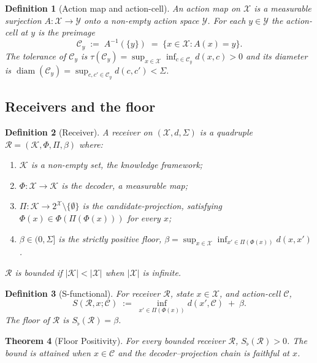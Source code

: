 \documentclass[11pt,a4paper]{article}
\newtheorem{theorem}{Theorem}[section]
\newtheorem{definition}[theorem]{Definition}
\DeclareMathOperator{\diam}{diam}
\newcommand{\Cands}{\mathcal{X}}
\newcommand{\Action}{\mathcal{Y}}
\newcommand{\Knowl}{\mathcal{K}}
\newcommand{\Cell}{\mathcal{C}}
\newcommand{\receiver}{\mathcal{R}}
\newcommand{\Sigmax}{\Sigma}
\newcommand{\Sscalar}{S}
\newcommand{\Sfloor}{S_{\flat}}
\begin{document}
\begin{definition}[Action map and action-cell]
\label{def:action}
An \emph{action map} on $\Cands$ is a measurable surjection $A : \Cands \to \Action$ onto a non-empty action space $\Action$. For each $y \in \Action$ the \emph{action-cell at $y$} is the preimage
\[
\Cell_y \;:=\; A^{-1}(\{y\}) \;=\; \{x \in \Cands : A(x) = y\}.
\]
The \emph{tolerance} of $\Cell_y$ is $\tau(\Cell_y) = \sup_{x \in \Cands} \inf_{c \in \Cell_y} d(x, c) > 0$ and its \emph{diameter} is $\diam(\Cell_y) = \sup_{c, c' \in \Cell_y} d(c, c') < \Sigmax$.
\end{definition}

\subsection{Receivers and the floor}

\begin{definition}[Receiver]
\label{def:receiver}
A \emph{receiver} on $(\Cands, d, \Sigmax)$ is a quadruple $\receiver = (\Knowl, \Phi, \Pi, \beta)$ where:
\begin{enumerate}[nosep, label=(\roman*)]
\item $\Knowl$ is a non-empty set, the \emph{knowledge framework};
\item $\Phi : \Cands \to \Knowl$ is the \emph{decoder}, a measurable map;
\item $\Pi : \Knowl \to 2^{\Cands} \setminus \{\emptyset\}$ is the \emph{candidate-projection}, satisfying $\Phi(x) \in \Phi(\Pi(\Phi(x)))$ for every $x$;
\item $\beta \in (0, \Sigmax]$ is the strictly positive \emph{floor}, $\beta = \sup_{x \in \Cands} \inf_{x' \in \Pi(\Phi(x))} d(x, x')$.
\end{enumerate}
$\receiver$ is \emph{bounded} if $|\Knowl| < |\Cands|$ when $|\Cands|$ is infinite.
\end{definition}

\begin{definition}[S-functional]
\label{def:S-functional}
For receiver $\receiver$, state $x \in \Cands$, and action-cell $\Cell$,
\[
\Sscalar(\receiver, x; \Cell) \;:=\; \inf_{x' \in \Pi(\Phi(x))} d(x', \Cell) \;+\; \beta.
\]
The \emph{floor of $\receiver$} is $\Sfloor(\receiver) = \beta$.
\end{definition}

\begin{theorem}[Floor Positivity]
\label{thm:floor}
For every bounded receiver $\receiver$, $\Sfloor(\receiver) > 0$. The bound is attained when $x \in \Cell$ and the decoder--projection chain is faithful at $x$.
\end{theorem}
\end{document}
